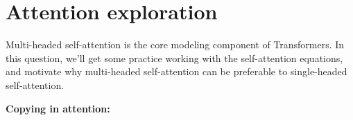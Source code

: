 
\section{Attention exploration}
\label{sec:analysis}
Multi-headed self-attention is the core modeling component of Transformers.
In this question, we'll get some practice working with the self-attention equations, and motivate why multi-headed self-attention can be preferable to single-headed self-attention.


\textbf{Copying in attention:}

